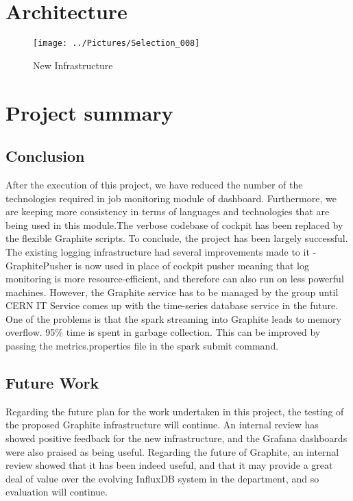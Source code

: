 \documentclass[11pt, letterpaper]{article}            %
\begin{document}
\section{Architecture}

	\begin{figure}[h]
									\centering
			\texttt{[image: ../Pictures/Selection\_008]}
							\caption{New Infrastructure}
	\end{figure}

\bigskip
\bigskip
\bigskip
\bigskip
\section{Project summary}
\subsection{Conclusion}
After the execution of this project, we have reduced the number of the technologies required in job monitoring module of dashboard. Furthermore, we are keeping more consistency in terms of languages and technologies that are being used in this module.The verbose codebase of cockpit has been replaced by the flexible Graphite scripts.
To conclude, the project has been largely successful. The existing logging infrastructure had several improvements made to it - GraphitePusher is now used in place of cockpit pusher meaning that log monitoring is more resource-efficient, and therefore can also run on less powerful machines. However, the Graphite service has to be managed by the group until CERN IT Service comes up with the time-series database service in the future. 
One of the problems is that the spark streaming into Graphite leads to memory overflow. 95\% time is spent in garbage collection. This can be improved by passing the metrics.properties file in the spark submit command. 

\subsection{Future Work}
Regarding the future plan for the work undertaken in this project, the testing of the proposed Graphite infrastructure will continue. An internal review has showed positive feedback for the new infrastructure, and the Grafana dashboards were also praised as being useful. Regarding the future of Graphite, an internal review showed that it has been indeed useful, and that it may provide a great deal of value over the evolving InfluxDB system in the department, and so evaluation will continue.
\end{document}
